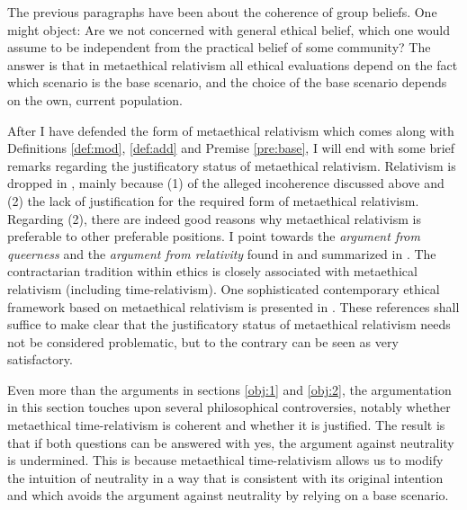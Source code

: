 The previous paragraphs have been about the coherence of group beliefs. One might object: Are we not concerned with general ethical belief, which one would assume to be independent from the practical belief of some community? The answer is that in metaethical relativism all ethical evaluations depend on the fact which scenario is the base scenario, and the choice of the base scenario depends on the own, current population. 

After I have defended the form of metaethical relativism which comes along with Definitions \ref{def:mod}, \ref{def:add} and Premise \ref{pre:base}, I will end with some brief remarks regarding the justificatory status of metaethical relativism. Relativism is dropped in , mainly because (1) of the alleged incoherence discussed above and (2) the lack of justification for the required form of metaethical relativism. Regarding (2), there are indeed good reasons why metaethical relativism is preferable to other preferable positions. I point towards the \emph{argument from queerness} and the \emph{argument from relativity} found in  and summarized in . The contractarian tradition within ethics is closely associated with metaethical relativism (including time-relativism). One sophisticated contemporary ethical framework based on metaethical relativism is presented in . These references shall suffice to make clear that the justificatory status of metaethical relativism needs not be considered problematic, but to the contrary can be seen as very satisfactory. 

Even more than the arguments in sections \ref{obj:1} and \ref{obj:2}, the argumentation in this section touches upon several philosophical controversies, notably whether metaethical time-relativism is coherent and whether it is justified. The result is that if both questions can be answered with yes, the argument against neutrality is undermined. This is because metaethical time-relativism allows us to modify the intuition of neutrality in a way that is consistent with its original intention and which avoids the argument against neutrality by relying on a base scenario. 